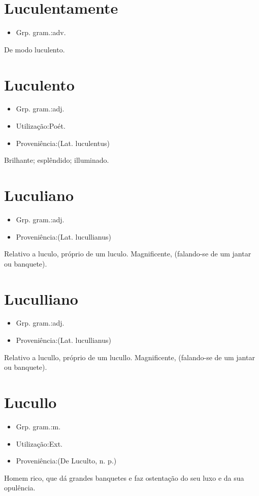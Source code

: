 \section{Luculentamente}
\begin{itemize}
\item {Grp. gram.:adv.}
\end{itemize}
De modo luculento.
\section{Luculento}
\begin{itemize}
\item {Grp. gram.:adj.}
\end{itemize}
\begin{itemize}
\item {Utilização:Poét.}
\end{itemize}
\begin{itemize}
\item {Proveniência:(Lat. \textunderscore luculentus\textunderscore )}
\end{itemize}
Brilhante; esplêndido; illuminado.
\section{Luculiano}
\begin{itemize}
\item {Grp. gram.:adj.}
\end{itemize}
\begin{itemize}
\item {Proveniência:(Lat. \textunderscore lucullianus\textunderscore )}
\end{itemize}
Relativo a luculo, próprio de um luculo.
Magnificente, (falando-se de um jantar ou banquete).
\section{Luculliano}
\begin{itemize}
\item {Grp. gram.:adj.}
\end{itemize}
\begin{itemize}
\item {Proveniência:(Lat. \textunderscore lucullianus\textunderscore )}
\end{itemize}
Relativo a lucullo, próprio de um lucullo.
Magnificente, (falando-se de um jantar ou banquete).
\section{Lucullo}
\begin{itemize}
\item {Grp. gram.:m.}
\end{itemize}
\begin{itemize}
\item {Utilização:Ext.}
\end{itemize}
\begin{itemize}
\item {Proveniência:(De \textunderscore Luculto\textunderscore , n. p.)}
\end{itemize}
Homem rico, que dá grandes banquetes e faz ostentação do seu luxo e da sua opulência.
